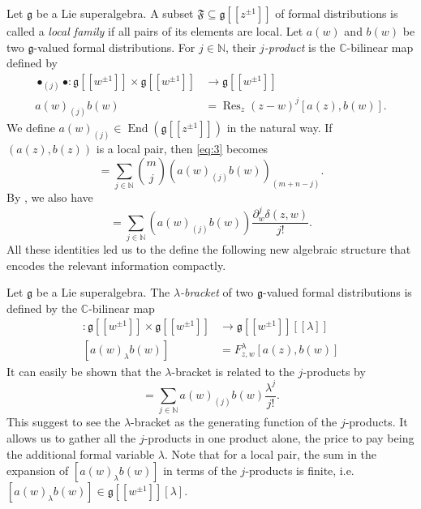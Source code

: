 \documentclass[a4paper, 12pt, reqno]{amsart}
\theoremstyle{remark}
\numberwithin{equation}{subsection}
\DeclareMathOperator{\End}{End}
\DeclareMathOperator{\Res}{Res}
\begin{document}
Let $\mathfrak{g}$ be a Lie superalgebra.
A subset $\mathfrak{F} \subseteq \mathfrak{g}[[z^{\pm 1}]]$ of formal distributions is called a \emph{local family} if all pairs of its elements are local.
Let $a(w)$ and $b(w)$ be two $\mathfrak{g}$-valued formal distributions.
For $j \in \mathbb{N}$, their \emph{$j$-product} is the $\mathbb{C}$-bilinear map defined by
\begin{align}
  \nonumber
  \bullet_{(j)}\bullet: \mathfrak{g}[[w^{\pm 1}]] \times \mathfrak{g}[[w^{\pm 1}]] &\to \mathfrak{g}[[w^{\pm 1}]]\\
  \label{eq:4}
  a(w)_{(j)}b(w) &= \Res_z(z - w)^j[a(z), b(w)].
\end{align}
We define $a(w)_{(j)} \in \End(\mathfrak{g}[[z^{\pm 1}]])$ in the natural way.
If $(a(z), b(z))$ is a local pair, then \eqref{eq:3} becomes
\begin{equation*}
  [a_{(m)}, b_{(n)}] = \sum_{j \in \mathbb{N}}\binom{m}{j}(a(w)_{(j)}b(w))_{(m + n - j)}.
\end{equation*}
By , we also have
\begin{equation*}
  [a(z),b(w)]=\sum_{j\in \mathbb{N}}(a(w)_{(j)}b(w))\frac{\partial_w^j\delta(z,w)}{j!}.
\end{equation*}
All these identities led us to the define the following new algebraic structure that encodes the relevant information compactly.

Let $\mathfrak{g}$ be a Lie superalgebra.
The \emph{$\lambda$-bracket} of two $\mathfrak{g}$-valued formal distributions is defined by the $\mathbb{C}$-bilinear map
\begin{align*}
  [\bullet_{\lambda}\bullet]: \mathfrak{g}[[w^{\pm 1}]] \times \mathfrak{g}[[w^{\pm 1}]] &\to \mathfrak{g}[[w^{\pm 1}]][[\lambda]] \\
  [a(w)_{\lambda}b(w)] &= F^{\lambda}_{z, w}[a(z), b(w)]
\end{align*}
It can easily be shown that the $\lambda$-bracket is related to the $j$-products by
\begin{equation*}
  [a(w)_{\lambda}b(w)] = \sum_{j \in \mathbb{N}}a(w)_{(j)}b(w)\frac{\lambda^j}{j!}.
\end{equation*}
This suggest to see the $\lambda$-bracket as the generating function of the $j$-products.
It allows us to gather all the $j$-products in one product alone, the price to pay being the additional formal variable $\lambda$.
Note that for a local pair, the sum in the expansion of $[a(w)_{\lambda} b(w)]$ in terms of the $j$-products is finite, i.e.\ $[a(w)_{\lambda}b(w)] \in \mathfrak{g}[[w^{\pm 1}]][\lambda]$.
\end{document}
